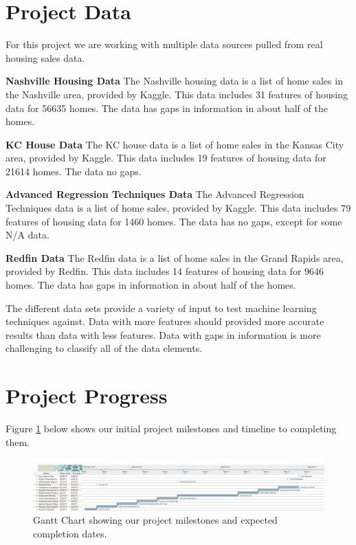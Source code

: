 \documentclass[letter,10pt]{article}
\begin{document}
\begin{multicols}{2}
		\section{Project Data}
		For this project we are working with multiple data sources pulled from real housing sales data.
		\par
		\textbf{Nashville Housing Data} The Nashville housing data is a list of home sales in the Nashville area, provided by Kaggle.  This data includes 31 features of housing data for 56635 homes.  The data has gaps in information in about half of the homes.
		\par
		\textbf{KC House Data} The KC house data is a list of home sales in the Kansas City area, provided by Kaggle.  This data includes 19 features of housing data for 21614 homes.  The data no gaps.
		\par
		\textbf{Advanced Regression Techniques Data} The Advanced Regression Techniques data is a list of home sales, provided by Kaggle.  This data includes 79 features of housing data for 1460 homes.  The data has no gaps, except for some N/A data.
		\par
		\textbf{Redfin Data} The Redfin data is a list of home sales in the Grand Rapids area, provided by Redfin.  This data includes 14 features of housing data for 9646 homes.  The data has gaps in information in about half of the homes.
		\par
		The different data sets provide a variety of input to test machine learning techniques against.  Data with more features should provided more accurate results than data with less features.  Data with gaps in information is more challenging to classify all of the data elements.
		\section{Project Progress}
		Figure \ref{fig:ganttchart} below shows our initial project milestones and timeline to completing them.
\begin{figure}[t]
    \centering
    \includegraphics[width=\textwidth]{Schedule/ProjectSchedule.png}
    \caption{Gantt Chart showing  our project milestones and expected completion dates.}
    \label{fig:ganttchart}
\end{figure}

\end{multicols}
\end{document}
